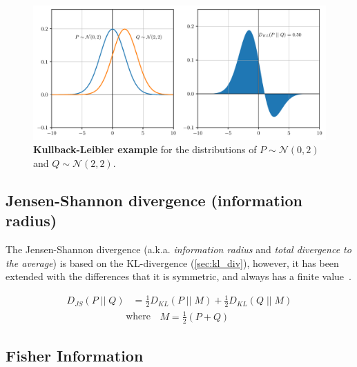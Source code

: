 \begin{figure}[!htp]
    \centering
    \includegraphics[width=0.9\linewidth]{graphics/kullback-leibler.pdf}
    \caption{\textbf{Kullback-Leibler example} for the distributions of
    $P\sim{}\mathcal{N}(0,2)$ and $Q\sim{}\mathcal{N}(2,2)$. }
    \label{fig:kullback-leibler}
\end{figure}

\subsection{Jensen-Shannon divergence (information radius)}

The Jensen-Shannon divergence (a.k.a. \textit{information radius} and
\textit{total divergence to the average}) is based on the KL-divergence
(\autoref{sec:kl_div}), however, it has been extended with the differences that
it is symmetric, and always has a finite value~\cite{Endres2003, Fuglede2004}.


\begin{equation}
    \begin{aligned}
    D_{JS}(P\;||\;Q) &= \frac{1}{2}D_{KL}(P\;||\;M) + \frac{1}{2}D_{KL}(Q\;||\;M)
    \end{aligned}
\end{equation}
\begin{equation*}
    \text{where}\;\;
    \begin{aligned}
        M = \frac{1}{2}(P+Q)
    \end{aligned}
\end{equation*}

\subsection{Fisher Information}\label{ssec:fisher_information}

